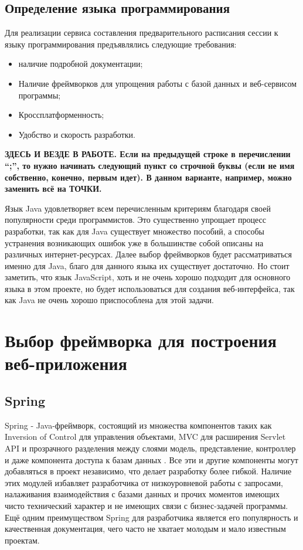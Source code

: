 \subsection{Определение языка программирования}
Для реализации сервиса составления предварительного расписания сессии к языку программирования предъявлялись следующие требования:
\begin{itemize}
	\item наличие подробной документации;
	\item Наличие фреймворков для упрощения работы с базой данных и веб-сервисом программы;
	\item Кроссплатформенность;
	\item Удобство и скорость разработки.
\end{itemize}

\textbf{ЗДЕСЬ И ВЕЗДЕ В РАБОТЕ. Если на предыдущей строке в перечислении ``;'', то нужно начинать следующий пункт со строчной буквы (если не имя собственно, конечно, первым идет). В данном варианте, например, можно заменить всё на ТОЧКИ.}

Язык Java удовлетворяет всем перечисленным критериям благодаря своей популярности среди программистов. Это существенно упрощает процесс разработки, так как для Java существует множество пособий, а способы устранения возникающих ошибок уже в большинстве собой описаны на различных интернет-ресурсах. Далее выбор фреймворков будет рассматриваться именно для Java, благо для данного языка их существует достаточно. Но стоит заметить, что язык JavaScript, хоть и не очень хорошо подходит для основного языка в этом проекте, но будет использоваться для создания веб-интерфейса, так как Java не очень хорошо приспособлена для этой задачи.

\section{Выбор фреймворка для построения веб-приложения} \label{ch3:sec2}
\subsection{Spring}
Spring - Java-фреймворк, состоящий из множества компонентов таких как Inversion of Control для управления объектами, MVC для расширения Servlet API и прозрачного разделения между слоями модель, представление, контроллер и даже компонента доступа к базам данных \cite{spring}. Все эти и другие компоненты могут добавляться в проект независимо, что делает разработку более гибкой. Наличие этих модулей избавляет разработчика от низкоуровневой работы с запросами, налаживания взаимодействия с базами данных и прочих моментов имеющих чисто технический характер и не имеющих связи с бизнес-задачей программы. Ещё одним преимуществом Spring  для разработчика является его популярность и качественная документация, чего часто не хватает молодым и мало известным проектам.

